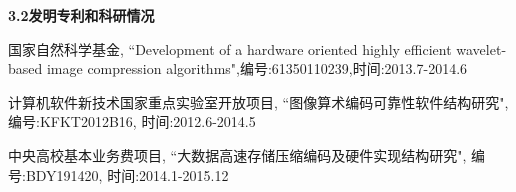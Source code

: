 \noindent\textbf{3.2发明专利和科研情况}
\begin{enumerate}[label={[\arabic*]}]
\item 国家自然科学基金, ``Development of a hardware oriented highly efficient wavelet-based image compression algorithms",编号:61350110239,时间:2013.7-2014.6
\item 计算机软件新技术国家重点实验室开放项目, ``图像算术编码可靠性软件结构研究", 编号:KFKT2012B16, 时间:2012.6-2014.5
\item 中央高校基本业务费项目, ``大数据高速存储压缩编码及硬件实现结构研究", 编号:BDY191420, 时间:2014.1-2015.12

\end{enumerate}



